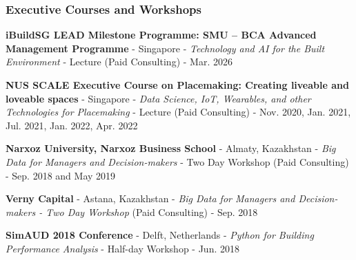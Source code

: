 \documentclass[10pt,a4paper]{article}
\begin{document}
\begin{small}
\subsubsection*{Executive Courses and Workshops}
\begin{etaremune}
\item 
\textbf{iBuildSG LEAD Milestone Programme: SMU – BCA Advanced Management Programme} - Singapore - \emph{Technology and AI for
the Built Environment} - Lecture (Paid Consulting) - Mar. 2026
\item 
\textbf{NUS SCALE Executive Course on Placemaking: Creating liveable and loveable spaces} - Singapore - \emph{Data Science, IoT, Wearables, and other Technologies for Placemaking} - Lecture (Paid Consulting) - Nov. 2020, Jan. 2021, Jul. 2021, Jan. 2022, Apr. 2022
\item
\textbf{Narxoz University, Narxoz Business School} - Almaty, Kazakhstan - \emph{Big Data for Managers and Decision-makers} - Two Day Workshop (Paid Consulting) - Sep. 2018 and May 2019
\item
\textbf{Verny Capital} - Astana, Kazakhstan - \emph{Big Data for Managers and Decision-makers - Two Day Workshop} (Paid Consulting) - Sep. 2018 
\item
\textbf{SimAUD 2018 Conference} - Delft, Netherlands - \emph{Python for Building Performance Analysis} - Half-day Workshop - Jun. 2018 
\end{etaremune}


\end{small}
\end{document}
